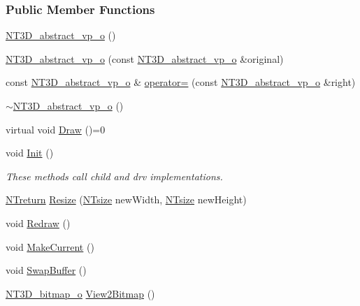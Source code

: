 \subsubsection*{Public Member Functions}
\begin{DoxyCompactItemize}
\item 
\hyperlink{class_n_t3_d__abstract__vp__o_a74c73c65e2192872ec2812509726076e}{NT3D\_\-abstract\_\-vp\_\-o} ()
\item 
\hyperlink{class_n_t3_d__abstract__vp__o_a90c715dba0a32ff590e54e8959032657}{NT3D\_\-abstract\_\-vp\_\-o} (const \hyperlink{class_n_t3_d__abstract__vp__o}{NT3D\_\-abstract\_\-vp\_\-o} \&original)
\item 
const \hyperlink{class_n_t3_d__abstract__vp__o}{NT3D\_\-abstract\_\-vp\_\-o} \& \hyperlink{class_n_t3_d__abstract__vp__o_a982912ba8e2e85df53d21dda40481cc0}{operator=} (const \hyperlink{class_n_t3_d__abstract__vp__o}{NT3D\_\-abstract\_\-vp\_\-o} \&right)
\item 
\hyperlink{class_n_t3_d__abstract__vp__o_a9b2ea028b9342b7d78dbfe69bc52f3e0}{$\sim$NT3D\_\-abstract\_\-vp\_\-o} ()
\item 
virtual void \hyperlink{class_n_t3_d__abstract__vp__o_a482ad19f8201baa2d298e337820fe2b2}{Draw} ()=0
\item 
void \hyperlink{class_n_t3_d__abstract__vp__o_a859e73397277b95940cc6d842a7fca9e}{Init} ()
\begin{DoxyCompactList}\small\item\em These methods call child and drv implementations. \item\end{DoxyCompactList}\item 
\hyperlink{nt__types_8h_ab9564ee8f091e809d21b8451c6683c53}{NTreturn} \hyperlink{class_n_t3_d__abstract__vp__o_a85c4415b7be898881ae7360e7df2c789}{Resize} (\hyperlink{nt__types_8h_a06c124f2e4469769b58230253ce0560b}{NTsize} newWidth, \hyperlink{nt__types_8h_a06c124f2e4469769b58230253ce0560b}{NTsize} newHeight)
\item 
void \hyperlink{class_n_t3_d__abstract__vp__o_a45bafcb9721b91bd88e2e91c17a6f4c3}{Redraw} ()
\item 
void \hyperlink{class_n_t3_d__abstract__vp__o_ab4537da43a1de2dce6ea0119df8446b7}{MakeCurrent} ()
\item 
void \hyperlink{class_n_t3_d__abstract__vp__o_adc452610655e9ce8ac6d91fb2f30735b}{SwapBuffer} ()
\item 
\hyperlink{class_n_t3_d__bitmap__o}{NT3D\_\-bitmap\_\-o} \hyperlink{class_n_t3_d__abstract__vp__o_a5cf2608761a3748591c1af0ca393587a}{View2Bitmap} ()

\end{DoxyCompactItemize}
